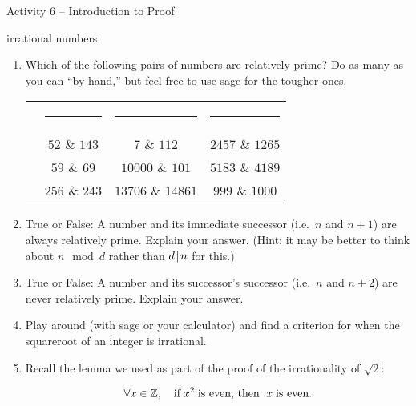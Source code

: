 \documentclass{amsart}
\begin{document}
\thispagestyle{empty}

\centerline{\Large Activity 6 -- Introduction to Proof}
\centerline{\large irrational numbers}

\bigskip
\Large


\begin{enumerate}
\item Which of the following pairs of numbers are relatively prime? Do as many as you can ``by hand,'' but feel free to use sage for the tougher ones.

\vspace{.1in}

\begin{tabular}{cccc}
 & \rule{72pt}{0pt} & \rule{72pt}{0pt} & \rule{72pt}{0pt} \\
\rule[-15pt]{0pt}{44pt} & $52$ \& $143$ &  $7$ \& $112$ & $2457$ \& $1265$\\
\rule[-15pt]{0pt}{44pt} & $59$ \& $69$ & $10000$ \& $101$ & $5183$ \& $4189$ \\
\rule[-15pt]{0pt}{44pt} & $256$ \& $243$ & $13706$ \& $14861$ & $999$ \& $1000$ \\
\end{tabular}

\rule{0pt}{0pt}

\vspace{.1in}

\rule{0pt}{0pt}

\item True or False: A number and its immediate successor (i.e.\ $n$ and $n+1$) are always relatively prime.  Explain your answer. (Hint: it may be better to think about $n \mod d$ rather than $d\!\mid\! n$ for this.)

\vfill

\item True or False: A number and its successor's successor (i.e.\ $n$ and $n+2$) are never relatively prime.  Explain your answer.

\vfill

\item Play around (with sage or your calculator) and find a criterion for when the squareroot of an integer is irrational.

\vfill

\newpage

\item Recall the lemma we used as part of the proof of the irrationality of $\sqrt{2}$:

\[ \forall x \in {\mathbb Z}, \quad \mbox{if} \; x^2 \; \mbox{is even, then } \; x \; \mbox{is even}. \]


\end{enumerate}
\end{document}
